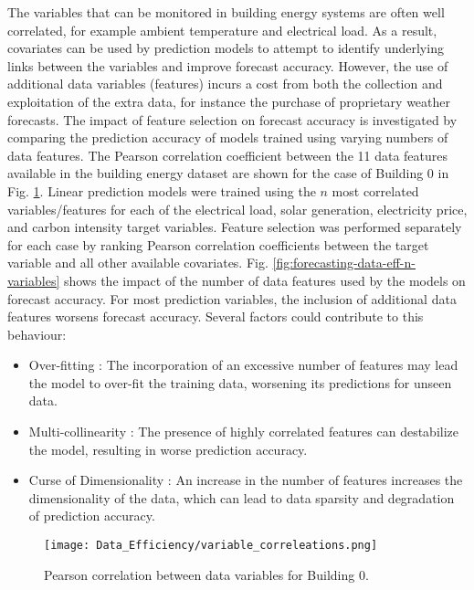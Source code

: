 The variables that can be monitored in building energy systems are often well correlated, for example ambient temperature and electrical load. As a result, covariates can be used by prediction models to attempt to identify underlying links between the variables and improve forecast accuracy. However, the use of additional data variables (features) incurs a cost from both the collection and exploitation of the extra data, for instance the purchase of proprietary weather forecasts. The impact of feature selection on forecast accuracy is investigated by comparing the prediction accuracy of models trained using varying numbers of data features. The Pearson correlation coefficient between the 11 data features available in the building energy dataset are shown for the case of Building 0 in Fig. \ref{fig:forecasting-data-eff-variable-correlations}. Linear prediction models were trained using the $n$ most correlated variables/features for each of the electrical load, solar generation, electricity price, and carbon intensity target variables. Feature selection was performed separately for each case by ranking Pearson correlation coefficients between the target variable and all other available covariates. Fig. \ref{fig:forecasting-data-eff-n-variables} shows the impact of the number of data features used by the models on forecast accuracy. For most prediction variables, the inclusion of additional data features worsens forecast accuracy. Several factors could contribute to this behaviour:
\begin{itemize}
    \item Over-fitting \citep{hawkins2004ProblemOverfitting} : The incorporation of an excessive number of features may lead the model to over-fit the training data, worsening its predictions for unseen data.
    \item Multi-collinearity \citep{farrar1967MulticollinearityRegressionAnalysis} : The presence of highly correlated features can destabilize the model, resulting in worse prediction accuracy.
    \item Curse of Dimensionality \citep{verleysen2005CurseDimensionalityData} : An increase in the number of features increases the dimensionality of the data, which can lead to data sparsity and degradation of prediction accuracy.
\end{itemize}

\begin{figure}
    \centering
    \texttt{[image: Data\_Efficiency/variable\_correleations.png]}
    \caption{Pearson correlation between data variables for Building 0.}
    \label{fig:forecasting-data-eff-variable-correlations}
\end{figure}


